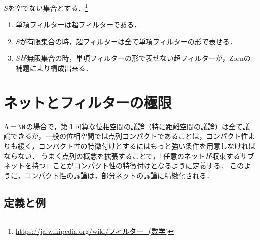 \documentclass[uplatex,dvipdfmx]{jsreport}
\begin{document}
\begin{proposition}\label{prop-ultrafilters-on-sets}
    $S$を空でない集合とする．\footnote{\url{https://ja.wikipedia.org/wiki/フィルター_(数学)}}
    \begin{enumerate}
        \item 単項フィルターは超フィルターである．
        \item $S$が有限集合の時，超フィルターは全て単項フィルターの形で表せる．
        \item $S$が無限集合の時，単項フィルターの形で表せない超フィルターが，Zornの補題により構成出来る．
    \end{enumerate}
\end{proposition}

\section{ネットとフィルターの極限}

\begin{tcolorbox}[colframe=ForestGreen, colback=ForestGreen!10!white,breakable,colbacktitle=ForestGreen!40!white,coltitle=black,fonttitle=\bfseries\sffamily,
title=]
    $\Lambda=\N$の場合で，第１可算な位相空間の議論（特に距離空間の議論）は全て議論できるが，一般の位相空間では点列コンパクトであることは，コンパクト性よりも緩く，コンパクト性の特徴付けとするにはもっと強い条件を用意しなければならない．
    うまく点列の概念を拡張することで，「任意のネットが収束するサブネットを持つ」ことがコンパクト性の特徴付けとなるように定義する．
    このように，コンパクト性の議論は，部分ネットの議論に精緻化される．
\end{tcolorbox}

\subsection{定義と例}
\end{document}
